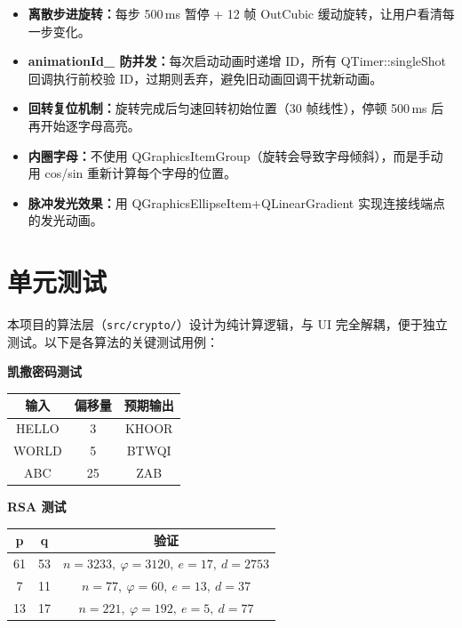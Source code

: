 \documentclass[a4paper,UTF8]{ctexart}
\begin{document}
\begin{itemize}
  \item \textbf{离散步进旋转：}每步 500\,ms 暂停 + 12 帧 OutCubic 缓动旋转，让用户看清每一步变化。
  \item \textbf{animationId\_ 防并发：}每次启动动画时递增 ID，所有 QTimer::singleShot 回调执行前校验 ID，过期则丢弃，避免旧动画回调干扰新动画。
  \item \textbf{回转复位机制：}旋转完成后匀速回转初始位置（30 帧线性），停顿 500\,ms 后再开始逐字母高亮。
  \item \textbf{内圈字母：}不使用 QGraphicsItemGroup（旋转会导致字母倾斜），而是手动用 cos/sin 重新计算每个字母的位置。
  \item \textbf{脉冲发光效果：}用 QGraphicsEllipseItem\;+\;QLinearGradient 实现连接线端点的发光动画。
\end{itemize}

\section{单元测试}

本项目的算法层（\texttt{src/crypto/}）设计为纯计算逻辑，与 UI 完全解耦，便于独立测试。以下是各算法的关键测试用例：

\textbf{凯撒密码测试}

\begin{center}
\begin{tabular}{ccc}
\toprule
\textbf{输入} & \textbf{偏移量} & \textbf{预期输出} \\
\midrule
HELLO & 3  & KHOOR \\
WORLD & 5  & BTWQI \\
ABC   & 25 & ZAB   \\
\bottomrule
\end{tabular}
\end{center}

\textbf{RSA 测试}

\begin{center}
\begin{tabular}{ccc}
\toprule
\textbf{p} & \textbf{q} & \textbf{验证} \\
\midrule
61 & 53 & $n=3233,\ \varphi=3120,\ e=17,\ d=2753$ \\
7  & 11 & $n=77,\ \varphi=60,\ e=13,\ d=37$         \\
13 & 17 & $n=221,\ \varphi=192,\ e=5,\ d=77$         \\
\bottomrule
\end{tabular}
\end{center}
\end{document}
